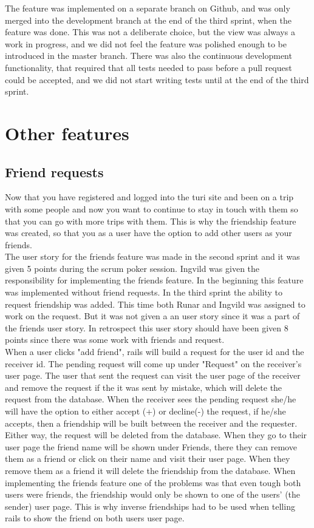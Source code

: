\documentclass[a4paper]{article}
\begin{document}
\noindent
The feature was implemented on a separate branch on Github, and was only merged into the development branch at the end of the third sprint, when the feature was done. This was not a deliberate choice, but the view was always a work in progress, and we did not feel the feature was polished enough to be introduced in the master branch. There was also the continuous development functionality, that required that all tests needed to pass before a pull request could be accepted, and we did not start writing tests until at the end of the third sprint. \\

\section{Other features}
\subsection{Friend requests}
Now that you have registered and logged into the turi site and been on a trip with some people and now you want to continue to stay in touch with them so that you can go with more trips with them. This is why the friendship feature was created, so that you as a user have the option to add other users as your friends. \\

\noindent
The user story for the friends feature was made in the second sprint and it was given 5 points during the scrum poker session. Ingvild was given the responsibility for implementing the friends feature. In the beginning this feature was implemented without friend requests. In the third sprint the ability to request friendship was added. This time both Runar and Ingvild was assigned to work on the request. But it was not given a an user story since it was a part of the friends user story. In retrospect this user story should have been given 8 points since there was some work with friends and request. \\

\noindent
When a user clicks "add friend", rails will build a request for the user id and the receiver id. The pending request will come up under "Request" on the receiver's user page. The user that sent the request can visit the user page of the receiver and remove the request if the it was sent by mistake, which will delete the request from the database. When the receiver sees the pending request she/he will have the option to either accept (+) or decline(-) the request, if he/she accepts, then a friendship will be built between the receiver and the requester. Either way, the request will be deleted from the database. When they go to their user page the friend name will be shown under Friends, there they can remove them as a friend or click on their name and visit their user page. When they remove them as a friend it will delete the friendship from the database. When implementing the friends feature one of the problems was that even tough both users were friends, the friendship would only be shown to one of the users' (the sender) user page. This is why inverse friendships had to be used when telling rails to show the friend on both users user page. \\
\end{document}
